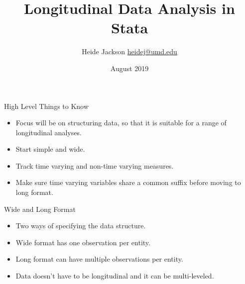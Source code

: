 \documentclass{beamer}
\title{Longitudinal Data Analysis in Stata}
\author{\texorpdfstring{Heide Jackson \newline\url{heidej@umd.edu}}{Author}}
\institute{University of Maryland Population Research Center}
\date{August 2019}
\begin{document}
\maketitle
\begin{frame}{High Level Things to Know}
\begin{itemize}
\item Focus will be on structuring data, so that it is suitable for a range of longitudinal analyses. 
\item Start simple and wide.
\item Track time varying and non-time varying measures.
\item Make sure time varying variables share a common suffix before moving to long format.
\end{itemize}
\end{frame}


\begin{frame}[fragile]{Wide and Long Format}

\begin{itemize}
\item Two ways of specifying the data structure.
\item Wide format has one observation per entity. 
\item Long format can have multiple observations per entity. 
\item Data doesn't have to be longitudinal and it can be multi-leveled.
\end{itemize}

\end{frame}
\end{document}
